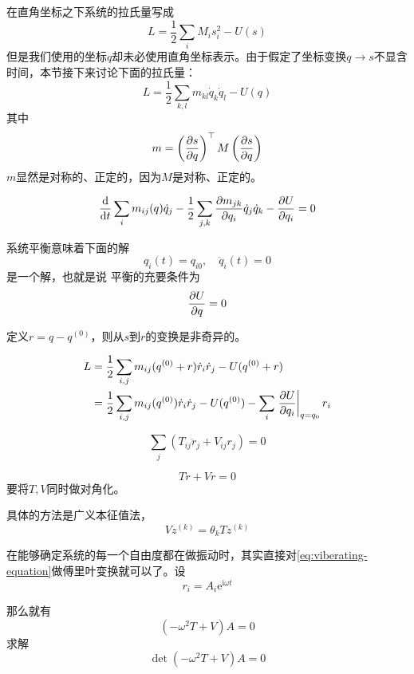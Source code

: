 \documentclass[UTF8, a4paper]{ctexart}
\newcommand*{\ee}{\mathrm{e}}
\newcommand*{\ii}{\mathrm{i}}
\begin{document}
在直角坐标之下系统的拉氏量写成
\[
    L = \frac{1}{2} \sum_i M_i s_i^2 - U(s)
\]
但是我们使用的坐标$q$却未必使用直角坐标表示。由于假定了坐标变换$q\longrightarrow s$不显含时间，本节接下来讨论下面的拉氏量：
\begin{equation}
    L = \frac{1}{2} \sum_{k,l} m_{kl} \dot{q}_k \dot{q}_l - U(q) 
\end{equation}
其中
\begin{equation}
    m = \left(\pdv{s}{q}\right)^\top M \left(\pdv{s}{q}\right)  
\end{equation}
$m$显然是对称的、正定的，因为$M$是对称、正定的。

\[
    \dv{t} \sum_{i} m_{ij}(q) \dot{q}_j - \frac{1}{2} \sum_{j, k} \pdv{m_{jk}}{q_i} \dot{q}_j \dot{q}_k - \pdv{U}{q_i} = 0
\]

系统平衡意味着下面的解
\[
    q_i(t) = q_{i0}, \quad \dot{q}_i(t) = 0
\]
是一个解，也就是说
平衡的充要条件为
\begin{equation}
    \pdv{U}{q} = 0
\end{equation}

定义$r = q - q^{(0)}$，则从$s$到$r$的变换是非奇异的。

\[
    \begin{aligned}
        L &= \frac{1}{2} \sum_{i,j} m_{ij} (q^{(0)}+r) \dot{r}_i \dot{r}_j - U(q^{(0)}+r) \\
        &= \frac{1}{2} \sum_{i,j} m_{ij}(q^{(0)}) \dot{r}_i \dot{r}_j - U(q^{(0)}) - \sum_{i} \eval{\pdv{U}{q_i}}_{q=q_0} r_i 
    \end{aligned}
\]

\begin{equation}
    \sum_{j} (T_{ij} \ddot{r}_j + V_{ij} r_j) = 0
    \label{eq:viberating-equation}
\end{equation}

\[
    T \ddot{r} + V r = 0
\]
要将$T,V$同时做对角化。

具体的方法是广义本征值法，
\begin{equation}
    V z^{(k)} = \theta_k T z^{(k)}
\end{equation}

在能够确定系统的每一个自由度都在做振动时，其实直接对\eqref{eq:viberating-equation}做傅里叶变换就可以了。设
\begin{equation}
    r_i = A_i \ee^{\ii \omega t}
\end{equation}

那么就有
\begin{equation}
    (-\omega^2 T + V) A = 0
    \label{eq:amplitude}
\end{equation}
求解
\begin{equation}
    \det (-\omega^2 T + V) A = 0
\end{equation}
\end{document}

